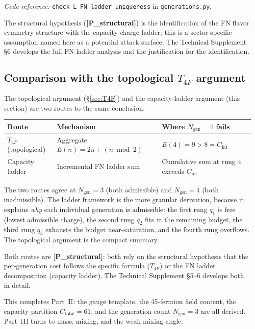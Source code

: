 \documentclass[11pt]{article}
\newcommand{\coderef}[2]{\smallskip\noindent\textit{Code reference:} \texttt{#1} in \texttt{#2}.}
\newcommand{\epitag}[1]{\textbf{[#1]}}
\theoremstyle{definition}
\begin{document}
\coderef{check\_L\_FN\_ladder\_uniqueness}{generations.py}

The structural hypothesis (\epitag{P\_structural}) is the identification of the FN flavor symmetry structure with the capacity-charge ladder; this is a sector-specific assumption named here as a potential attack surface. The Technical Supplement \S6 develops the full FN ladder analysis and the justification for the identification.

\subsection{Comparison with the topological \texorpdfstring{$T_{4F}$}{T4F} argument}\label{sec:T4F_vs_ladder}

The topological argument (\S\ref{sec:T4F}) and the capacity-ladder argument (this section) are two routes to the same conclusion:

\begin{center}\small
\begin{tabular}{@{}l l l@{}}
\toprule
\textbf{Route} & \textbf{Mechanism} & \textbf{Where $N_{\mathrm{gen}} = 4$ fails} \\
\midrule
$T_{4F}$ (topological) & Aggregate $E(n) = 2n + (n \bmod 2)$ & $E(4) = 9 > 8 = C_{\mathrm{int}}$ \\
Capacity ladder & Incremental FN ladder sum & Cumulative sum at rung 4 exceeds $C_{\mathrm{int}}$ \\
\bottomrule
\end{tabular}
\end{center}

The two routes agree at $N_{\mathrm{gen}} = 3$ (both admissible) and $N_{\mathrm{gen}} = 4$ (both inadmissible). The ladder framework is the more granular derivation, because it explains \emph{why} each individual generation is admissible: the first rung $q_1$ is free (lowest admissible charge), the second rung $q_2$ fits in the remaining budget, the third rung $q_3$ exhausts the budget near-saturation, and the fourth rung overflows. The topological argument is the compact summary.

Both routes are \epitag{P\_structural}: both rely on the structural hypothesis that the per-generation cost follows the specific formula ($T_{4F}$) or the FN ladder decomposition (capacity ladder). The Technical Supplement \S5--6 develops both in detail.

This completes Part~II: the gauge template, the 45-fermion field content, the capacity partition $C_{\mathrm{total}} = 61$, and the generation count $N_{\mathrm{gen}} = 3$ are all derived. Part~III turns to mass, mixing, and the weak mixing angle.
\end{document}
